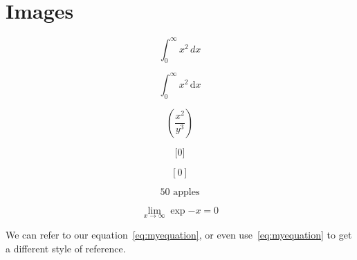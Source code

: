 \documentclass[12pt,twoside,a4paper]{article}
\begin{document}
\section{Images}

\setlength\fboxrule{6pt}
\setlength\fboxsep{0pt}


\[ \int_0^\infty x^2\,dx \]

\[ \int_0^\infty x^2\,\mathrm{d}x\]

\[  \left(\frac{x^2}{y^3}\right) \]

\[ \Bigg[ 0\Bigg] \]

\[ [ 0 ] \]

\[ 50 \text{ apples} \]

\begin{equation}
\label{eq:myequation}
    \lim_{x \to \infty} \exp{-x} = 0
\end{equation}

We can refer to our equation~\ref{eq:myequation}, or even use~\eqref{eq:myequation} to get a different style of reference.
\end{document}
